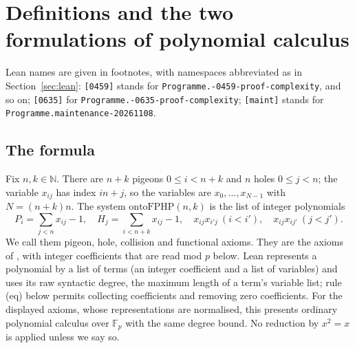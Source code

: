 
\section{Definitions and the two formulations of polynomial calculus}\label{sec:defs}

\begingroup\sloppy
Lean names are given in footnotes, with namespaces abbreviated as in
Section~\ref{sec:lean}: \texttt{[0459]} stands for
\texttt{Programme.-0459-proof-complexity\guillemotright}, and so on;
\texttt{[0635]} for \texttt{Programme.-0635-proof-complexity\guillemotright};
\texttt{[maint]} stands for
\texttt{Programme.\guillemotleft maintenance-20261108\guillemotright}.

\subsection{The formula}\label{sec:defs-formula}

Fix $n,k\in\mathbb N$.  There are $n+k$ pigeons $0\le i<n+k$ and $n$ holes
$0\le j<n$; the variable $x_{ij}$ has index $in+j$, so the variables are
$x_0,\dots,x_{N-1}$ with $N=(n+k)n$.  The system $\mathrm{ontoFPHP}(n,k)$ is the list of
integer polynomials
\[
  \textstyle P_i=\sum_{j<n}x_{ij}-1,\quad H_j=\sum_{i<n+k}x_{ij}-1,\quad
  x_{ij}x_{i'j}\ (i<i'),\quad x_{ij}x_{ij'}\ (j<j').
\]
We call them pigeon, hole, collision and functional axioms.
They are the axioms of \cite[Def.~7.2]{beame1998counting}, with integer coefficients that
are read mod $p$ below.  Lean represents a polynomial by a list of terms (an integer coefficient and a list of
variables) and uses its raw syntactic degree, the maximum length of a term's variable list;
rule (eq) below permits collecting coefficients and removing zero coefficients.  For the
displayed axioms, whose representations are normalised, this presents ordinary polynomial
calculus over $\mathbb F_p$ with the same degree bound.  No reduction by $x^2=x$ is applied
unless we say so.

